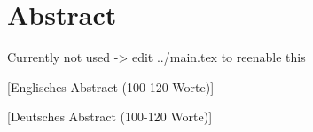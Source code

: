 \section*{Abstract}\label{abstract}

Currently not used -\textgreater{} edit ../main.tex to reenable this

{[}Englisches Abstract (100-120 Worte){]}

{[}Deutsches Abstract (100-120 Worte){]}
